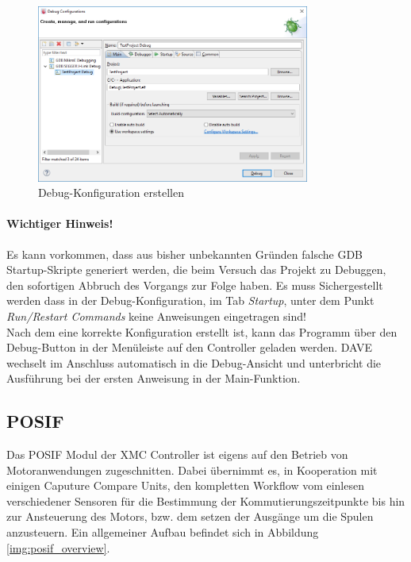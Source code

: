 \begin{figure}[ht]
\centering
\includegraphics[width=0.8\textwidth]{sensor/dave_debugConfig.PNG}
\caption{Debug-Konfiguration erstellen}
\label{img:dave_debugConfig}
\end{figure}

\paragraph{Wichtiger Hinweis!} Es kann vorkommen, dass aus bisher unbekannten Gründen falsche GDB Startup-Skripte generiert werden, die beim Versuch das Projekt zu Debuggen, den sofortigen Abbruch des Vorgangs zur Folge haben. Es muss Sichergestellt werden dass in der Debug-Konfiguration, im Tab \textit{Startup}, unter dem Punkt \textit{Run/Restart Commands} keine Anweisungen eingetragen sind! \\

\noindent
Nach dem eine korrekte Konfiguration erstellt ist, kann das Programm über den Debug-Button in der Menüleiste auf den Controller geladen werden. DAVE wechselt im Anschluss automatisch in die Debug-Ansicht und unterbricht die Ausführung bei der ersten Anweisung in der Main-Funktion.

\subsection{POSIF}
\label{lbl:sensor_posif}
Das POSIF Modul der XMC Controller ist eigens auf den Betrieb von Motoranwendungen zugeschnitten. Dabei übernimmt es, in Kooperation mit einigen Caputure Compare Units, den kompletten Workflow vom einlesen verschiedener Sensoren für die Bestimmung der Kommutierungszeitpunkte bis hin zur Ansteuerung des Motors, bzw. dem setzen der Ausgänge um die Spulen anzusteuern. Ein allgemeiner Aufbau befindet sich in Abbildung \ref{img:posif_overview}.

